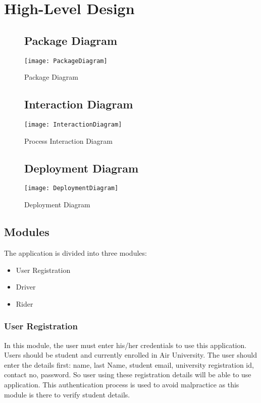 \section{High-Level Design}

\begin{figure}[!h]
\subsection{Package Diagram}
\center
\texttt{[image: PackageDiagram]}
\caption{Package Diagram}
\label{fig:Package Diagram}
\end{figure}

\begin{figure}[!h]
\subsection{Interaction Diagram}
\center
\texttt{[image: InteractionDiagram]}
\caption{Process Interaction Diagram}
\label{fig:Process Interaction Diagram}
\end{figure}

\begin{figure}[!h]
\subsection{Deployment Diagram}
\center
\texttt{[image: DeploymentDiagram]}
\caption{Deployment Diagram}
\label{fig:Deployment Diagram}
\end{figure}

\clearpage

\subsection{Modules}

The application is divided into three modules:
\begin{itemize}
\item User Registration
\item Driver
\item Rider
\end{itemize}

\subsubsection{User Registration}
In this module, the user must enter his/her credentials to use this application. Users should be student and currently enrolled in Air University. The user should enter the details first: name, last Name, student email, university registration id, contact no, password. So user using these registration details will be able to use application. This authentication process is used to avoid malpractice as this module is there to verify student details.


